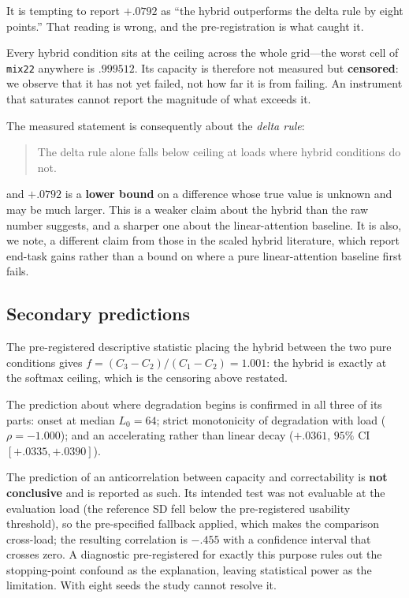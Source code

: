 \documentclass{article}
\begin{document}
It is tempting to report $+.0792$ as ``the hybrid outperforms the delta rule by eight points.''
That reading is wrong, and the pre-registration is what caught it.

Every hybrid condition sits at the ceiling across the whole grid---the worst cell of
\texttt{mix22} anywhere is $.999512$. Its capacity is therefore not measured but
\textbf{censored}: we observe that it has not yet failed, not how far it is from failing. An
instrument that saturates cannot report the magnitude of what exceeds it.

The measured statement is consequently about the \emph{delta rule}:

\begin{quote}
The delta rule alone falls below ceiling at loads where hybrid conditions do not.
\end{quote}

and $+.0792$ is a \textbf{lower bound} on a difference whose true value is unknown and may be
much larger. This is a weaker claim about the hybrid than the raw number suggests, and a
sharper one about the linear-attention baseline. It is also, we note, a different claim from
those in the scaled hybrid literature, which report end-task gains rather than a bound on where
a pure linear-attention baseline first fails.

\subsection{Secondary predictions}

The pre-registered descriptive statistic placing the hybrid between the two pure conditions
gives $f = (C_3-C_2)/(C_1-C_2) = 1.001$: the hybrid is exactly at the softmax ceiling, which is
the censoring above restated.

The prediction about where degradation begins is confirmed in all three of its parts: onset at
median $L_0 = 64$; strict monotonicity of degradation with load ($\rho = -1.000$); and an
accelerating rather than linear decay ($+.0361$, $95\%$ CI $[+.0335, +.0390]$).

The prediction of an anticorrelation between capacity and correctability is \textbf{not
conclusive} and is reported as such. Its intended test was not evaluable at the evaluation load
(the reference SD fell below the pre-registered usability threshold), so the pre-specified
fallback applied, which makes the comparison cross-load; the resulting correlation is $-.455$
with a confidence interval that crosses zero. A diagnostic pre-registered for exactly this
purpose rules out the stopping-point confound as the explanation, leaving statistical power as
the limitation. With eight seeds the study cannot resolve it.
\end{document}
